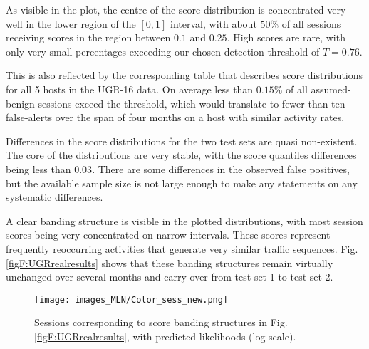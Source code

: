 


As visible in the plot, the centre of the score distribution is concentrated very well in the lower region of the $[0,1]$ interval, with about $50\%$ of all sessions receiving scores in the region between $0.1$ and $0.25$. High scores are rare, with only very small percentages exceeding our chosen detection threshold of $T=0.76$.



This is also reflected by the corresponding table that describes score distributions for all 5 hosts in the UGR-16 data. On average less than $0.15\%$ of all assumed-benign sessions exceed the threshold, which would translate to fewer than ten false-alerts over the span of four months on a host with similar activity rates. 

Differences in the score distributions for the two test sets are quasi non-existent. The core of the distributions are very stable, with the score quantiles differences being less than $0.03$.
There are some differences in the observed false positives, but the available sample size is not large enough to make any statements on any systematic differences.

A clear banding structure is visible in the plotted distributions, with most session scores being very concentrated on narrow intervals. These scores represent frequently reoccurring activities that generate very similar traffic sequences. %
Fig. \ref{figF:UGRrealresults} shows that these banding structures remain virtually unchanged over several months and carry over from test set 1 to test set 2. 


\begin{figure}
\centering
\texttt{[image: images\_MLN/Color\_sess\_new.png]} 
\caption{Sessions corresponding to score banding structures in Fig. \ref{figF:UGRrealresults}, with predicted likelihoods (log-scale).}\label{figF:colsess}
\end{figure}

